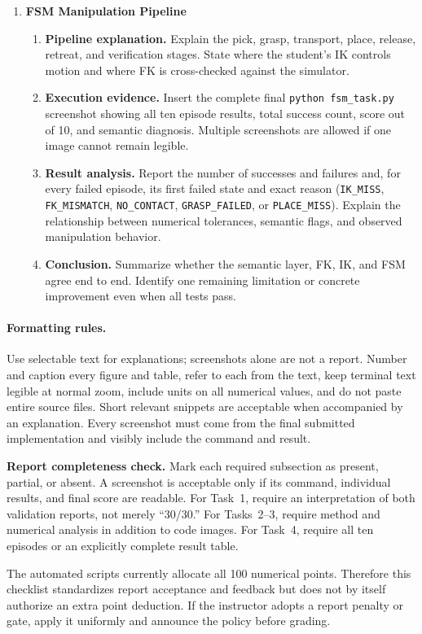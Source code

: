 \documentclass[11pt]{article}
\newcommand{\code}[1]{\nolinkurl{#1}}
\begin{document}
\begin{enumerate}[label=\textbf{\arabic*.},leftmargin=2em]
  \item \textbf{FSM Manipulation Pipeline}
  \begin{enumerate}[label*=\arabic*.,leftmargin=2.4em]
    \item \textbf{Pipeline explanation.} Explain the pick, grasp, transport,
      place, release, retreat, and verification stages. State where the
      student's IK controls motion and where FK is cross-checked against the
      simulator.
    \item \textbf{Execution evidence.} Insert the complete final
      \code{python fsm_task.py} screenshot showing all ten episode results,
      total success count, score out of 10, and semantic diagnosis. Multiple
      screenshots are allowed if one image cannot remain legible.
    \item \textbf{Result analysis.} Report the number of successes and failures
      and, for every failed episode, its first failed state and exact reason
      (\code{IK_MISS}, \code{FK_MISMATCH}, \code{NO_CONTACT},
      \code{GRASP_FAILED}, or \code{PLACE_MISS}). Explain the relationship
      between numerical tolerances, semantic flags, and observed manipulation
      behavior.
    \item \textbf{Conclusion.} Summarize whether the semantic layer, FK, IK,
      and FSM agree end to end. Identify one remaining limitation or concrete
      improvement even when all tests pass.
  \end{enumerate}
\end{enumerate}

\paragraph{Formatting rules.}
Use selectable text for explanations; screenshots alone are not a report.
Number and caption every figure and table, refer to each from the text, keep
terminal text legible at normal zoom, include units on all numerical values,
and do not paste entire source files. Short relevant snippets are acceptable
when accompanied by an explanation. Every screenshot must come from the final
submitted implementation and visibly include the command and result.

\begin{tutornote}
\textbf{Report completeness check.} Mark each required subsection as present,
partial, or absent. A screenshot is acceptable only if its command, individual
results, and final score are readable. For Task~1, require an interpretation of
both validation reports, not merely ``30/30.'' For Tasks~2--3, require method
and numerical analysis in addition to code images. For Task~4, require all ten
episodes or an explicitly complete result table.

The automated scripts currently allocate all 100 numerical points. Therefore
this checklist standardizes report acceptance and feedback but does not by
itself authorize an extra point deduction. If the instructor adopts a report
penalty or gate, apply it uniformly and announce the policy before grading.
\end{tutornote}
\end{document}
